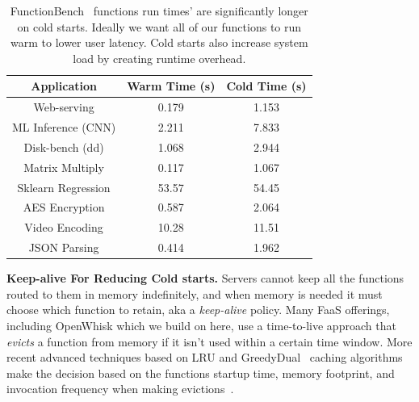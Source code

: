 \begin{table}
  \begin{tabular}{ c c c }
\hline
  Application & Warm Time (s) & Cold Time (s) \\ 
\hline
  Web-serving & 0.179 & 1.153 \\  
  ML Inference (CNN) & 2.211 & 7.833 \\
  Disk-bench (dd) & 1.068 & 2.944 \\  
  Matrix Multiply & 0.117 & 1.067 \\  
  Sklearn Regression & 53.57 & 54.45 \\  
  AES Encryption & 0.587 & 2.064 \\  
  Video Encoding & 10.28 & 11.51 \\  
  JSON Parsing & 0.414 & 1.962 \\
\hline
\end{tabular}
\caption{FunctionBench~\cite{kim_functionbench_2019} functions run times' are significantly longer on cold starts. Ideally we want all of our functions to run warm to lower user latency. Cold starts also increase system load by creating runtime overhead.}
\label{tab:func-times}
\end{table}



\noindent \textbf{Keep-alive For Reducing Cold starts.}
Servers cannot keep all the functions routed to them in memory indefinitely, and when memory is needed it must choose which function to retain, aka a \emph{keep-alive} policy.
Many FaaS offerings, including OpenWhisk which we build on here, use a time-to-live approach that \emph{evicts} a function from memory if it isn't used within a certain time window.
%
More recent advanced techniques based on LRU and GreedyDual~\cite{gdsf} caching algorithms make the decision based on the functions startup time, memory footprint, and invocation frequency when making evictions~\cite{faascache-asplos21}.

